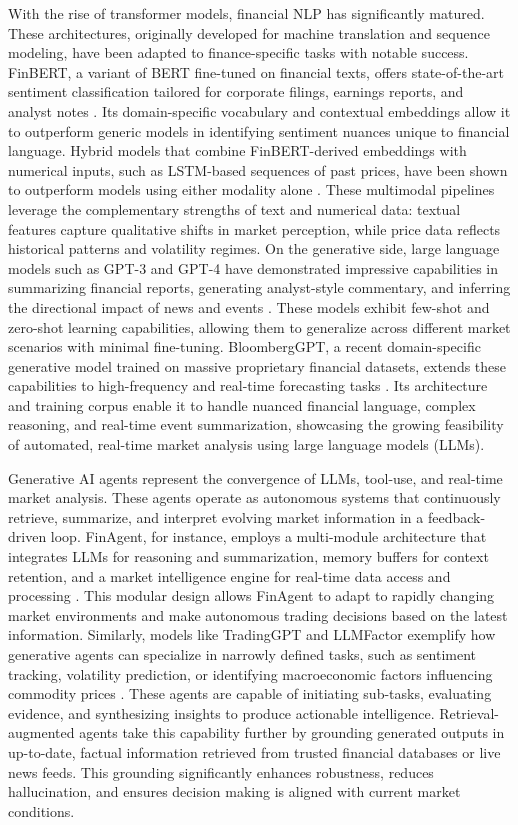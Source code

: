 \documentclass[12pt]{elsarticle}
\begin{document}
With the rise of transformer models, financial NLP has significantly matured. These architectures, originally developed for machine translation and sequence modeling, have been adapted to finance-specific tasks with notable success. FinBERT, a variant of BERT fine-tuned on financial texts, offers state-of-the-art sentiment classification tailored for corporate filings, earnings reports, and analyst notes \cite{Liu2020}. Its domain-specific vocabulary and contextual embeddings allow it to outperform generic models in identifying sentiment nuances unique to financial language. Hybrid models that combine FinBERT-derived embeddings with numerical inputs, such as LSTM-based sequences of past prices, have been shown to outperform models using either modality alone \cite{Chen2024}. These multimodal pipelines leverage the complementary strengths of text and numerical data: textual features capture qualitative shifts in market perception, while price data reflects historical patterns and volatility regimes. On the generative side, large language models such as GPT-3 and GPT-4 have demonstrated impressive capabilities in summarizing financial reports, generating analyst-style commentary, and inferring the directional impact of news and events \cite{LopezLira2023}. These models exhibit few-shot and zero-shot learning capabilities, allowing them to generalize across different market scenarios with minimal fine-tuning. BloombergGPT, a recent domain-specific generative model trained on massive proprietary financial datasets, extends these capabilities to high-frequency and real-time forecasting tasks \cite{Wu2023}. Its architecture and training corpus enable it to handle nuanced financial language, complex reasoning, and real-time event summarization, showcasing the growing feasibility of automated, real-time market analysis using large language models (LLMs).

Generative AI agents \cite{mghali} represent the convergence of LLMs, tool-use, and real-time market analysis. These agents operate as autonomous systems that continuously retrieve, summarize, and interpret evolving market information in a feedback-driven loop. FinAgent, for instance, employs a multi-module architecture that integrates LLMs for reasoning and summarization, memory buffers for context retention, and a market intelligence engine for real-time data access and processing \cite{Zhang2024}. This modular design allows FinAgent to adapt to rapidly changing market environments and make autonomous trading decisions based on the latest information. Similarly, models like TradingGPT and LLMFactor exemplify how generative agents can specialize in narrowly defined tasks, such as sentiment tracking, volatility prediction, or identifying macroeconomic factors influencing commodity prices \cite{Li2023,Wang2024}. These agents are capable of initiating sub-tasks, evaluating evidence, and synthesizing insights to produce actionable intelligence. Retrieval-augmented agents take this capability further by grounding generated outputs in up-to-date, factual information retrieved from trusted financial databases or live news feeds. This grounding significantly enhances robustness, reduces hallucination, and ensures decision making is aligned with current market conditions.
\end{document}
